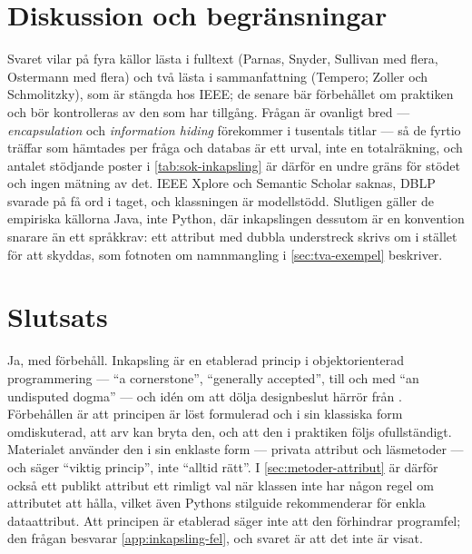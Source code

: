\section{Diskussion och begränsningar}
\label{sec:ink-diskussion}

Svaret vilar på fyra källor lästa i fulltext (Parnas, Snyder, Sullivan
med flera, Ostermann med flera) och två lästa i sammanfattning (Tempero;
Zoller och Schmolitzky), som är stängda hos IEEE; de senare bär
förbehållet om praktiken och bör kontrolleras av den som har tillgång.
Frågan är ovanligt bred --- \emph{encapsulation} och \emph{information
hiding} förekommer i tusentals titlar --- så de fyrtio träffar som
hämtades per fråga och databas är ett urval, inte en totalräkning, och
antalet stödjande poster i \cref{tab:sok-inkapsling} är därför en undre
gräns för stödet och ingen mätning av det.  IEEE Xplore och Semantic
Scholar saknas, DBLP svarade på få ord i taget, och klassningen är
modellstödd.  Slutligen gäller de empiriska källorna Java, inte Python,
där inkapslingen dessutom är en konvention snarare än ett språkkrav:
ett attribut med dubbla understreck skrivs om i stället för att skyddas,
som fotnoten om namnmangling i \cref{sec:tva-exempel} beskriver.

\section{Slutsats}
\label{sec:ink-slutsats}

Ja, med förbehåll.  Inkapsling är en etablerad princip i objektorienterad
programmering --- \enquote{a cornerstone}, \enquote{generally accepted},
till och med \enquote{an undisputed dogma}
\autocite{Sullivan2001Modularity,Tempero2009Fields,Ostermann2011Revisiting}
--- och idén om att dölja designbeslut härrör från
\textcite{Parnas1972Criteria}.  Förbehållen är att principen är löst
formulerad och i sin klassiska form omdiskuterad, att arv kan bryta den,
och att den i praktiken följs ofullständigt.  Materialet använder den i
sin enklaste form --- privata attribut och läsmetoder --- och säger
\enquote{viktig princip}, inte \enquote{alltid rätt}.  I
\cref{sec:metoder-attribut} är därför också ett publikt attribut ett
rimligt val när klassen inte har någon regel om attributet att hålla,
vilket även Pythons stilguide rekommenderar för enkla
dataattribut\autocite{pep8}.  Att principen är etablerad säger inte att
den förhindrar programfel; den frågan besvarar \cref{app:inkapsling-fel},
och svaret är att det inte är visat.

